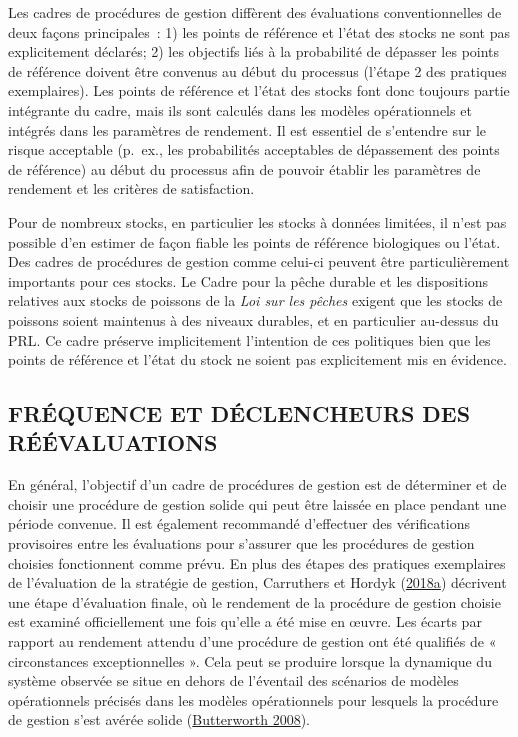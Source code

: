 \documentclass[french,11pt]{book}
\begin{document}
Les cadres de procédures de gestion diffèrent des évaluations conventionnelles de deux façons principales~: 1) les points de référence et l'état des stocks ne sont pas explicitement déclarés; 2) les objectifs liés à la probabilité de dépasser les points de référence doivent être convenus au début du processus (l'étape 2 des pratiques exemplaires). Les points de référence et l'état des stocks font donc toujours partie intégrante du cadre, mais ils sont calculés dans les modèles opérationnels et intégrés dans les paramètres de rendement. Il est essentiel de s'entendre sur le risque acceptable (p.~ex., les probabilités acceptables de dépassement des points de référence) au début du processus afin de pouvoir établir les paramètres de rendement et les critères de satisfaction.

Pour de nombreux stocks, en particulier les stocks à données limitées, il n'est pas possible d'en estimer de façon fiable les points de référence biologiques ou l'état. Des cadres de procédures de gestion comme celui-ci peuvent être particulièrement importants pour ces stocks. Le Cadre pour la pêche durable et les dispositions relatives aux stocks de poissons de la \emph{Loi sur les pêches} exigent que les stocks de poissons soient maintenus à des niveaux durables, et en particulier au-dessus du PRL. Ce cadre préserve implicitement l'intention de ces politiques bien que les points de référence et l'état du stock ne soient pas explicitement mis en évidence.

\hypertarget{sec:discussion-triggers}{%
\subsection{FRÉQUENCE ET DÉCLENCHEURS DES RÉÉVALUATIONS}\label{sec:discussion-triggers}}

En général, l'objectif d'un cadre de procédures de gestion est de déterminer et de choisir une procédure de gestion solide qui peut être laissée en place pendant une période convenue. Il est également recommandé d'effectuer des vérifications provisoires entre les évaluations pour s'assurer que les procédures de gestion choisies fonctionnent comme prévu. En plus des étapes des pratiques exemplaires de l'évaluation de la stratégie de gestion, Carruthers et Hordyk (\protect\hyperlink{ref-carruthers2018}{2018a}) décrivent une étape d'évaluation finale, où le rendement de la procédure de gestion choisie est examiné officiellement une fois qu'elle a été mise en œuvre. Les écarts par rapport au rendement attendu d'une procédure de gestion ont été qualifiés de « circonstances exceptionnelles ». Cela peut se produire lorsque la dynamique du système observée se situe en dehors de l'éventail des scénarios de modèles opérationnels précisés dans les modèles opérationnels pour lesquels la procédure de gestion s'est avérée solide (\protect\hyperlink{ref-butterworth2008}{Butterworth 2008}).
\end{document}
